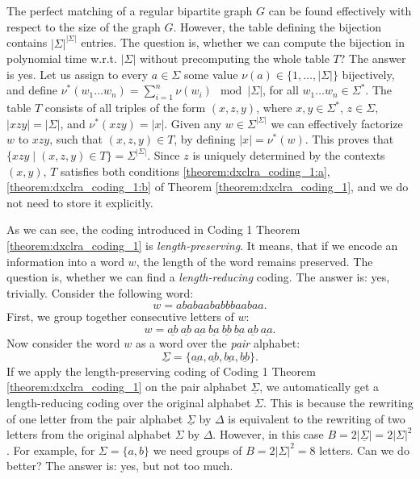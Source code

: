 The perfect matching of a regular bipartite graph $G$ can be found effectively with respect to the size of the graph $G$. However, the table defining the bijection contains $|\Sigma|^{|\Sigma|}$ entries.  The question is, whether we can compute the bijection in polynomial time w.r.t. $|\Sigma|$ without precomputing the whole table $T$? The answer is yes. Let us assign to every $a \in \Sigma$ some value $\nu(a) \in \{1, \ldots, |\Sigma|\}$ bijectively, and define $\nu^*(w_1 \ldots w_n) = \sum_{i = 1}^{n} \nu(w_i) \mod |\Sigma|$, for all $w_1 \ldots w_n \in \Sigma^*$. The table $T$ consists of all triples of the form $(x, z, y)$, where $x, y \in \Sigma^*$, $z \in \Sigma$, $|xzy| = |\Sigma|$, and $\nu^*(xzy) = |x|$. Given any $w \in \Sigma^{|\Sigma|}$ we can effectively factorize $w$ to $xzy$, such that $(x, z, y) \in T$, by defining $|x| = \nu^*(w)$. This proves that $\{ xzy \mid (x, z, y) \in T \} = \Sigma^{|\Sigma|}$. Since $z$ is uniquely determined by the contexts $(x, y)$, $T$ satisfies both conditions \ref{theorem:dxclra_coding_1:a}, \ref{theorem:dxclra_coding_1:b} of Theorem \ref{theorem:dxclra_coding_1}, and we do not need to store it explicitly.

As we can see, the coding introduced in Coding 1 Theorem \ref{theorem:dxclra_coding_1} is \emph{length-preserving}. It means, that if we encode an information into a word $w$, the length of the word remains preserved. The question is, whether we can find a \emph{length-reducing} coding. The answer is: yes, trivially. Consider the following word:
$$w = ababaababbbaabaa.$$
First, we group together consecutive letters of $w$:
$$w = \underline{ab}\ \underline{ab}\ \underline{aa}
\ \underline{ba}\ \underline{bb}\ \underline{ba}
\ \underline{ab}\ \underline{aa}.$$
Now consider the word $w$ as a word over the \emph{pair} alphabet:
$$\underline{\Sigma} = \{\underline{aa}, \underline{ab},
\underline{ba}, \underline{bb}\}.$$
If we apply the length-preserving coding of Coding 1 Theorem \ref{theorem:dxclra_coding_1} on the pair alphabet $\underline{\Sigma}$, we automatically get a length-reducing coding over the original alphabet $\Sigma$. This is because the rewriting of one letter from the pair alphabet $\underline{\Sigma}$ by $\Delta$ is equivalent to the rewriting of two letters from the original alphabet $\Sigma$ by $\Delta$. However, in this case $B = 2|\underline{\Sigma}| = 2|\Sigma|^2$. For example, for $\Sigma = \{a, b\}$ we need groups of $B = 2|\Sigma|^2 = 8$ letters. Can we do better? The answer is: yes, but not too much.

